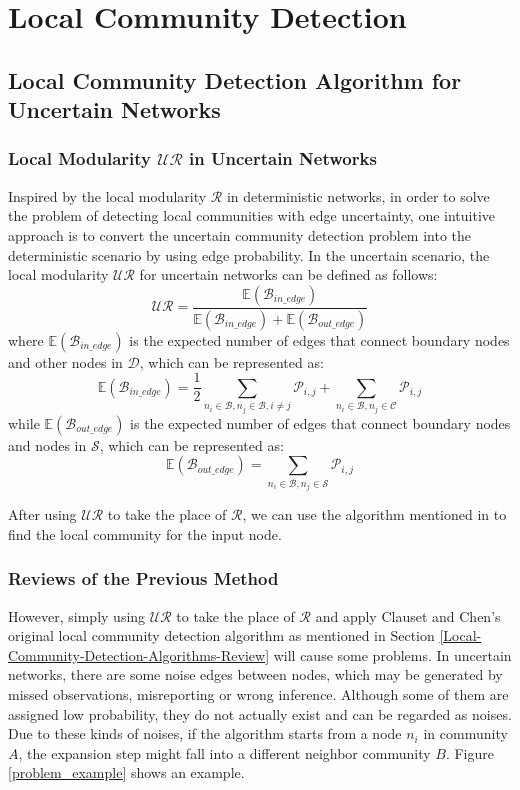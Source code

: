 \documentclass[\main/thesis.tex]{subfiles}
\begin{document}
\chapter{Local Community Detection}
\section{Local Community Detection Algorithm for Uncertain Networks}
\subsection{Local Modularity $\mathcal{UR}$ in Uncertain Networks}
Inspired by the local modularity $\mathcal{R}$ in deterministic networks, in order to solve the problem of detecting local communities with edge uncertainty, one intuitive approach is to convert the uncertain community detection problem into the deterministic scenario by using edge probability. In the uncertain scenario, the local modularity $\mathcal{UR}$ for uncertain networks can be defined as follows:
\begin{equation}
\mathcal{UR} = \frac{\mathbb{E}(\mathcal{B}_{in\_edge})}{\mathbb{E}(\mathcal{B}_{in\_edge})+\mathbb{E}(\mathcal{B}_{out\_edge})}
\label{UR-Local}
\end{equation}
where $\mathbb{E}(\mathcal{B}_{in\_edge})$ is the expected number of edges that connect boundary nodes and other nodes in $\mathcal{D}$, which can be represented as:
\begin{equation}
\mathbb{E}(\mathcal{B}_{in\_edge}) = \frac{1}{2}\sum_{n_i\in \mathcal{B},n_j\in \mathcal{B},i\neq j}\mathcal{P}_{i,j}+\sum_{n_i\in \mathcal{B},n_j\in \mathcal{C}}\mathcal{P}_{i,j}
\end{equation}
while $\mathbb{E}(\mathcal{B}_{out\_edge})$ is the expected number of edges that connect boundary nodes and nodes in $\mathcal{S}$, which can be represented as:
\begin{equation}
\mathbb{E}(\mathcal{B}_{out\_edge}) = \sum_{n_i\in \mathcal{B},n_j\in \mathcal{S}}\mathcal{P}_{i,j}
\end{equation}

After using $\mathcal{UR}$ to take the place of $\mathcal{R}$, we can use the algorithm mentioned in \cite{clauset2005finding,chen2009detecting} to find the local community for the input node. 
\subsection{Reviews of the Previous Method}
However, simply using $\mathcal{UR}$ to take the place of $\mathcal{R}$ and apply Clauset and Chen's original local community detection algorithm as mentioned in Section \ref{Local-Community-Detection-Algorithms-Review} will cause some problems. In uncertain networks, there are some noise edges between nodes, which may be generated by missed observations, misreporting or wrong inference. Although some of them are assigned low probability, they do not actually exist and can be regarded as noises. Due to these kinds of noises, if the algorithm starts from a node $n_i$ in community $A$, the expansion step might fall into a different neighbor community $B$. Figure \ref{problem_example} shows an example.
\end{document}
